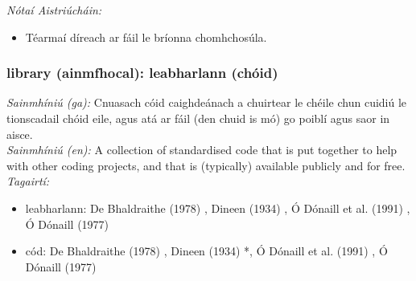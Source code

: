  \noindent \textit{Nótaí Aistriúcháin:}
\begin{itemize}
	\item Téarmaí díreach ar fáil le bríonna chomhchosúla.
\end{itemize}


\subsubsection*{library (ainmfhocal): leabharlann (chóid)}
 \noindent \textit{Sainmhíniú (ga):} Cnuasach cóid caighdeánach a chuirtear le chéile chun cuidiú le tionscadail chóid eile, agus atá ar fáil (den chuid is mó) go poiblí agus saor in aisce.
\\
 \noindent \textit{Sainmhíniú (en):} A collection of standardised code that is put together to help with other coding projects, and that is (typically) available publicly and for free.
\\
 \noindent \textit{Tagairtí:}
\begin{itemize}
	\item leabharlann: De Bhaldraithe (1978) \cite{de-bhaldraithe}, Dineen (1934) \cite{dineen}, Ó Dónaill et al. (1991) \cite{focloir-beag}, Ó Dónaill (1977) \cite{odonaill}
	\item cód: De Bhaldraithe (1978) \cite{de-bhaldraithe}, Dineen (1934) \cite{dineen}*, Ó Dónaill et al. (1991) \cite{focloir-beag}, Ó Dónaill (1977) \cite{odonaill}
\end{itemize}


